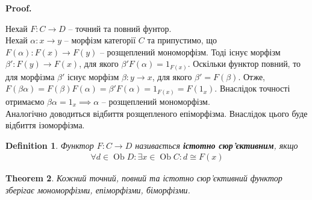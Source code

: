 \documentclass[a4paper, 10pt]{article}
\makeatletter
\theoremstyle{theoremdd}
\newtheorem{theorem}{Theorem}[subsection]
\newtheorem{definition}[theorem]{Definition}
\renewenvironment{proof}[1][Proof.\\]{\par
\pushQED{\hfill \qed}%
\normalfont \topsep6\p@\@plus6\p@\relax
\trivlist
\item\relax
{\bfseries
#1\@addpunct{.}}\hspace\labelsep\ignorespaces
}{%
\popQED\endtrivlist\@endpefalse
}
\DeclareMathOperator{\Ob}{Ob}
\makeatother
\begin{document}
\begin{proof}
Нехай $F \colon C \to D$ -- точний та повний фунтор. \\
Нехай $\alpha \colon x \to y$ -- морфізм категорії $C$ та припустимо, що $F(\alpha) \colon F(x) \to F(y)$ -- розщеплений мономорфізм. Тоді існує морфізм $\beta' \colon F(y) \to F(x)$, для якого $\beta' F(\alpha) = 1_{F(x)}$. Оскільки функтор повний, то для морфізма $\beta'$ існує морфізм $\beta \colon y \to x$, для якого $\beta' = F(\beta)$. Отже, $F(\beta \alpha) = F(\beta) F(\alpha) = \beta' F(\alpha) = 1_{F(x)} = F(1_x)$. Внаслідок точності отримаємо $\beta \alpha = 1_x \implies \alpha$ -- розщеплений мономорфізм.\\
Аналогічно доводиться відбиття розщепленого епіморфізма. Внаслідок цього буде відбиття ізоморфізма.
\end{proof}

\begin{definition}
Функтор $F \colon C \to D$ називається \textbf{істотно сюр'єктивним}, якщо
\begin{align*}
\forall d \in \Ob D: \exists x \in \Ob C: d \cong F(x)
\end{align*}
\end{definition}

\begin{theorem}
Кожний точний, повний та істотно сюр'єктивний функтор зберігає мономорфізми, епіморфізми, біморфізми.
\end{theorem}
\end{document}
